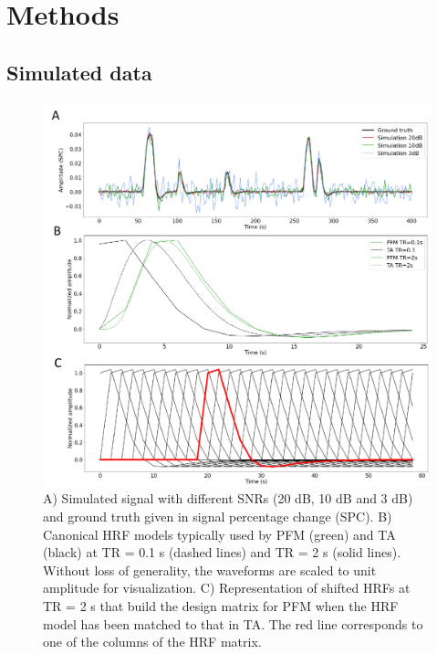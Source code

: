 
\section{Methods}
\label{sec:data}

\subsection{Simulated data}

\begin{figure}[t!]
    \begin{center}
        \includegraphics[width=0.75\columnwidth]{figures/sim_and_hrf.pdf}
    \end{center}
    \caption{A) Simulated signal with different SNRs (20 dB, 10 dB and 3 dB) and ground truth given in signal percentage change (SPC). B) Canonical HRF models typically used by PFM (green) and TA (black) at TR = 0.1 s (dashed lines) and TR = 2 s (solid lines). Without loss of generality, the waveforms are scaled to unit amplitude for visualization. C) Representation of shifted HRFs at TR = 2 s that build the design matrix for PFM when the HRF model has been matched to that in TA. The red line corresponds to one of the columns of the HRF matrix. }
\label{fig:sim_and_hrf}
\end{figure}

